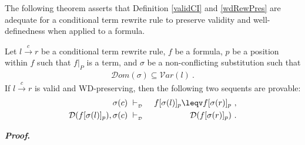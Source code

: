 \documentclass[copyright]{eptcs}
\begin{document}
The following theorem asserts that Definition \ref{validCI} and \ref{wdRewPres} are adequate for a conditional term rewrite rule to preserve validity and well-definedness when applied to a formula.
\begin{theorem}\label{thm2}
Let $l \xrightarrow{c} r$ be a conditional term rewrite rule, $f$ be a formula, $p$ be a position within $f$ such that $f|_P$ is a term, and $\sigma$ be a non-conflicting substitution such that
\begin{eqnarray*}
\mathcal{D}om(\sigma) \subseteq \mathcal{V}ar(l)~.
\end{eqnarray*}
If $l \xrightarrow{c} r$ is valid and WD-preserving, then the following two sequents are provable:
\begin{eqnarray}
\sigma(c)&~\vdash_{_\mathcal{D}}~&f[\sigma(l)]_p \leqv f[\sigma(r)]_p~, \label{formulaVal}\\
\mathcal{D}(f[\sigma(l)]_p), \sigma(c)&~\vdash_{_\mathcal{D}}~&\mathcal{D}(f[\sigma(r)]_p)~\label{formulaWD}.
\end{eqnarray}
\end{theorem}
\noindent \textbf{\textit{Proof}. }
\end{document}
